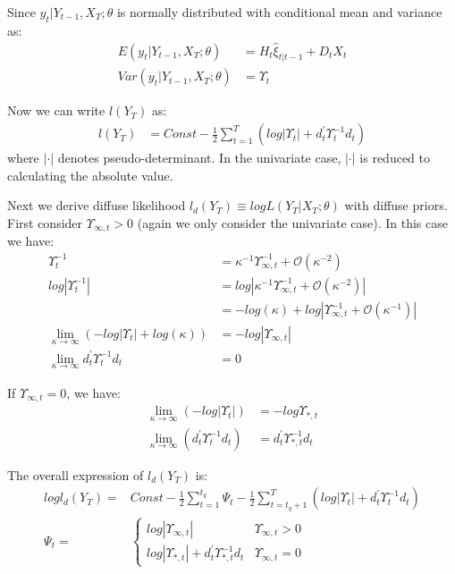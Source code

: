 \documentclass[10pt, titlepage]{article}
\numberwithin{equation}{section}
\begin{document}
Since $y_t|Y_{t-1},X_T;\theta$ is normally distributed with conditional mean and variance as:
\begin{align*}
    E(y_t|Y_{t-1},X_T;\theta) &= H_t\hat{\xi}_{t|t-1} + D_tX_t \\
    Var(y_t|Y_{t-1},X_T;\theta) &= \Upsilon_t
\end{align*}

Now we can write $l(Y_T)$ as:
\begin{align*}
    l(Y_T) &= Const - \frac{1}{2}\sum_{t=1}^T(log|\Upsilon_t| + d_t^{'}\Upsilon_t^{-1}d_t)
\end{align*}
where $|\cdot|$ denotes pseudo-determinant. In the univariate case, $|\cdot|$ is reduced to calculating the absolute value.

Next we derive diffuse likelihood $l_d(Y_T)\equiv logL(Y_T|X_T;\theta)$ with diffuse priors. First consider $\Upsilon_{\infty,t}>0$ (again we only consider the univariate case). In this case we have:
\begin{align*}
    \Upsilon_t^{-1} &= \kappa^{-1}\Upsilon_{\infty,t}^{-1}+\mathcal{O}(\kappa^{-2}) \\
    log|\Upsilon_t^{-1}| &= log|\kappa^{-1}\Upsilon_{\infty,t}^{-1}+\mathcal{O}(\kappa^{-2})| \\
    &=-log(\kappa) + log|\Upsilon_{\infty,t}^{-1}+\mathcal{O}(\kappa^{-1})| \\
    \lim_{\kappa\rightarrow \infty}(-log|\Upsilon_t| + log(\kappa)) &= -log|\Upsilon_{\infty,t}| \\
    \lim_{\kappa\rightarrow \infty}d_t^{'}\Upsilon_t^{-1}d_t &= 0
\end{align*}

If $\Upsilon_{\infty,t}=0$, we have:
\begin{align*}
    \lim_{\kappa\rightarrow \infty}(-log|\Upsilon_t|) &= -log{\Upsilon_{*,t}} \\
    \lim_{\kappa\rightarrow \infty}(d_t^{'}\Upsilon_t^{-1}d_t) &= d_t^{'}\Upsilon_{*,t}^{-1}d_t
\end{align*}

The overall expression of $l_d(Y_T)$ is:
\begin{align*}
    logl_d(Y_T) =& Const - \frac{1}{2}\sum_{t=1}^{t_q}\Psi_t - \frac{1}{2}\sum_{t=t_q+1}^{T}(log|\Upsilon_t| + d_t^{'}\Upsilon_t^{-1}d_t) \nonumber \\
    \Psi_t =& \begin{cases}
        log|\Upsilon_{\infty,t}| & \Upsilon_{\infty,t} > 0 \\
        log|\Upsilon_{*,t}| + d_t^{'}\Upsilon_{*,t}^{-1}d_t & \Upsilon_{\infty,t}=0
    \end{cases} \nonumber
\end{align*}
\end{document}

